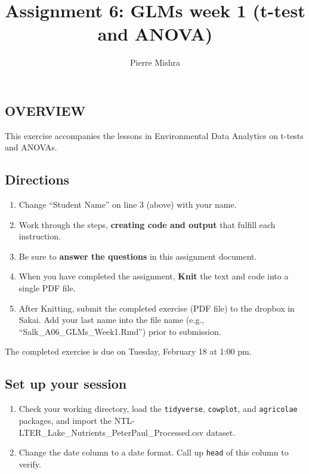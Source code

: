 \documentclass[
]{article}
\title{Assignment 6: GLMs week 1 (t-test and ANOVA)}
\author{Pierre Mishra}
\date{}
\providecommand{\tightlist}{%
  \setlength{\itemsep}{0pt}\setlength{\parskip}{0pt}}
\begin{document}
\maketitle

\hypertarget{overview}{%
\subsection{OVERVIEW}\label{overview}}

This exercise accompanies the lessons in Environmental Data Analytics on
t-tests and ANOVAs.

\hypertarget{directions}{%
\subsection{Directions}\label{directions}}

\begin{enumerate}
\def\labelenumi{\arabic{enumi}.}
\tightlist
\item
  Change ``Student Name'' on line 3 (above) with your name.
\item
  Work through the steps, \textbf{creating code and output} that fulfill
  each instruction.
\item
  Be sure to \textbf{answer the questions} in this assignment document.
\item
  When you have completed the assignment, \textbf{Knit} the text and
  code into a single PDF file.
\item
  After Knitting, submit the completed exercise (PDF file) to the
  dropbox in Sakai. Add your last name into the file name (e.g.,
  ``Salk\_A06\_GLMs\_Week1.Rmd'') prior to submission.
\end{enumerate}

The completed exercise is due on Tuesday, February 18 at 1:00 pm.

\hypertarget{set-up-your-session}{%
\subsection{Set up your session}\label{set-up-your-session}}

\begin{enumerate}
\def\labelenumi{\arabic{enumi}.}
\item
  Check your working directory, load the \texttt{tidyverse},
  \texttt{cowplot}, and \texttt{agricolae} packages, and import the
  NTL-LTER\_Lake\_Nutrients\_PeterPaul\_Processed.csv dataset.
\item
  Change the date column to a date format. Call up \texttt{head} of this
  column to verify.
\end{enumerate}
\end{document}
